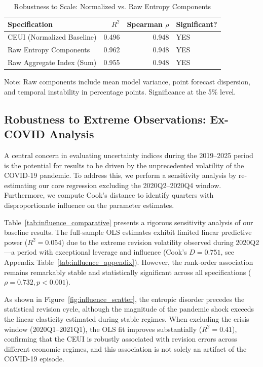 \documentclass[12pt,a4paper]{article}
\theoremstyle{remark}
\begin{document}
\begin{table}[ht]
\centering
\begin{threeparttable}
\caption{Robustness to Scale: Normalized vs. Raw Entropy Components}
\label{tab:raw_scale_robustness}
\footnotesize
\begin{tabular}{lrrl}
\toprule
Specification & $R^2$ & Spearman $\rho$ & Significant? \\
\midrule
CEUI (Normalized Baseline) & 0.496 & 0.948 & YES \\
Raw Entropy Components      & 0.962 & 0.948 & YES \\
Raw Aggregate Index (Sum)   & 0.955 & 0.948 & YES \\
\bottomrule
\end{tabular}
\begin{tablenotes}
  \small \item Note: Raw components include mean model variance, point forecast dispersion, and temporal instability in percentage points. Significance at the 5\% level.
\end{tablenotes}
\end{threeparttable}
\end{table}

\subsection{Robustness to Extreme Observations: Ex-COVID Analysis}
\label{sec:robustness_covid}

A central concern in evaluating uncertainty indices during the 2019--2025 period is the potential for results to be driven by the unprecedented volatility of the COVID-19 pandemic. To address this, we perform a sensitivity analysis by re-estimating our core regression excluding the 2020Q2--2020Q4 window. Furthermore, we compute Cook's distance to identify quarters with disproportionate influence on the parameter estimates.

Table~\ref{tab:influence_comparative} presents a rigorous sensitivity analysis of our baseline results. The full-sample OLS estimates exhibit limited linear predictive power ($R^2 = 0.054$) due to the extreme revision volatility observed during 2020Q2---a period with exceptional leverage and influence (Cook's $D = 0.751$, see Appendix Table~\ref{tab:influence_appendix}). However, the rank-order association remains remarkably stable and statistically significant across all specifications ($\rho = 0.732, p < 0.001$).

As shown in Figure~\ref{fig:influence_scatter}, the entropic disorder precedes the statistical revision cycle, although the magnitude of the pandemic shock exceeds the linear elasticity estimated during stable regimes. When excluding the crisis window (2020Q1--2021Q1), the OLS fit improves substantially ($R^2 = 0.41$), confirming that the CEUI is robustly associated with revision errors across different economic regimes, and this association is not solely an artifact of the COVID-19 episode.
\end{document}
